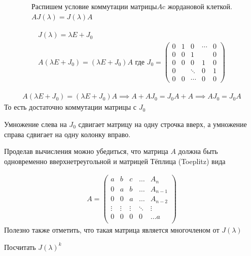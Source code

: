 \begin{sol}
\begin{gather*}
    \mbox{Распишем условие коммутации матрицы} A \mbox{c жордановой клеткой.} \\
    A J(\lambda) = J(\lambda) A
\end{gather*}

\begin{gather*}
    J(\lambda) = \lambda E + J_{0} \\
    A (\lambda E + J_{0}) = (\lambda E + J_{0}) A 
    \mbox{ где } J_{0} = \left(\begin{array}{ccccc}
       0 & 1 & 0 & \cdots & 0\\
       0 & 0 & 1 & & 0 \\
       0 & 0 & 0 & 1& 0\\
       0 & & \ddots & 0 &1\\
       0 & 0 & \cdots & 0 & 0
    \end{array}\right)
\end{gather*}

\begin{gather*}
     A (\lambda E + J_{0}) = (\lambda E + J_{0}) A  \implies A + A J_{0} =
     J_{0}A + A \implies A J_{0} = J_{0} A 
\end{gather*}
То есть достаточно коммутации матрицы с $J_{0}$

Умножение слева на $J_{0}$ сдвигает матрицу на одну строчка вверх,
а умножение справа сдвигает на одну колонку вправо.


Проделав вычисления можно убедиться, что матрица $A$ должна быть одновременно вверхнетреугольной и матрицей Тёплица (Toeplitz) вида

\begin{gather*}
A = \begin{pmatrix}
a & b & c & \dots & A_n \\
  0 & a & b  & \dots & A_{n-1} \\
  0 & 0 & a  & \dots & A_{n-2} \\
\vdots & \vdots & \vdots & \ddots & \vdots \\
0 & 0 & 0 & 0 &\dots a \\
\end{pmatrix}
\end{gather*}
Полезно также отметить, что такая матрица является многочленом от $J(\lambda)$
\end{sol}

\begin{prb}
Посчитать $J(\lambda)^k$
\end{prb}

